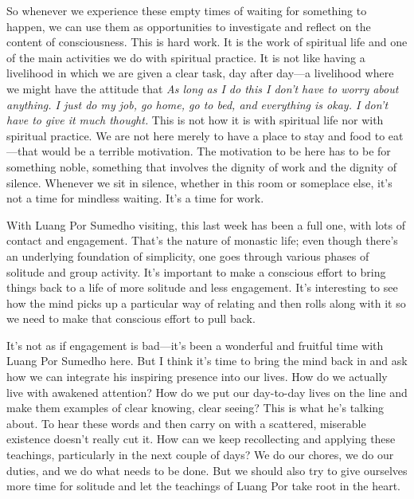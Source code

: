 So whenever we experience these empty times of waiting for something to 
happen, we can use them as opportunities to investigate and reflect on 
the content of consciousness. This is hard work. It is the work of 
spiritual life and one of the main activities we do with spiritual 
practice. It is not like having a livelihood in which we are given a 
clear task, day after day---a livelihood where we might have the 
attitude that \emph{As long as I do this I don't have to worry about 
anything. I just do my job, go home, go to bed, and everything is okay. 
I don't have to give it much thought.} This is not how it is with 
spiritual life nor with spiritual practice. We are not here merely to 
have a place to stay and food to eat---that would be a terrible 
motivation. The motivation to be here has to be for something noble, 
something that involves the dignity of work and the dignity of silence. 
Whenever we sit in silence, whether in this room or someplace else, 
it's not a time for mindless waiting. It's a time for work.


With Luang Por Sumedho visiting, this last week has been a full one, 
with lots of contact and engagement. That's the nature of monastic 
life; even though there's an underlying foundation of simplicity, one 
goes through various phases of solitude and group activity. It's 
important to make a conscious effort to bring things back to a life of 
more solitude and less engagement. It's interesting to see how the mind 
picks up a particular way of relating and then rolls along with it so 
we need to make that conscious effort to pull back.

It's not as if engagement is bad---it's been a wonderful and fruitful 
time with Luang Por Sumedho here. But I think it's time to bring the 
mind back in and ask how we can integrate his inspiring presence into 
our lives. How do we actually live with awakened attention? How do we 
put our day-to-day lives on the line and make them examples of clear 
knowing, clear seeing? This is what he's talking about. To hear these 
words and then carry on with a scattered, miserable existence doesn't 
really cut it. How can we keep recollecting and applying these 
teachings, particularly in the next couple of days? We do our chores, 
we do our duties, and we do what needs to be done. But we should also 
try to give ourselves more time for solitude and let the teachings of 
Luang Por take root in the heart.


